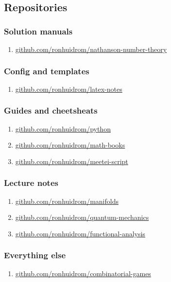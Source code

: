 \documentclass{article}
\begin{document}
\subsection*{Repositories}

\subsubsection*{Solution manuals}

\begin{enumerate}[resume]
\item \href{https://github.com/ronhuidrom/nathanson-number-theory}{github.com/ronhuidrom/nathanson-number-theory}
\end{enumerate}

\subsubsection*{Config and templates}

\begin{enumerate}[resume]
\item \href{https://github.com/ronhuidrom/latex-notes}{github.com/ronhuidrom/latex-notes}
\end{enumerate}

\subsubsection*{Guides and cheetsheats}

\begin{enumerate}[resume]
\item \href{https://github.com/ronhuidrom/python}{github.com/ronhuidrom/python} 
\item \href{https://github.com/ronhuidrom/math-books}{github.com/ronhuidrom/math-books} 
\item \href{https://github.com/ronhuidrom/meetei-script}{github.com/ronhuidrom/meetei-script} 
\end{enumerate}

\subsubsection*{Lecture notes}

\begin{enumerate}[resume]
\item \href{https://github.com/ronhuidrom/manifolds}{github.com/ronhuidrom/manifolds}
\item \href{https://github.com/ronhuidrom/quantum-mechanics}{github.com/ronhuidrom/quantum-mechanics}
\item \href{https://github.com/ronhuidrom/functional-analysis}{github.com/ronhuidrom/functional-analysis}
\end{enumerate}

\subsubsection*{Everything else}

\begin{enumerate}[resume]
\item \href{https://github.com/ronhuidrom/combinatorial-games}{github.com/ronhuidrom/combinatorial-games}
\end{enumerate}
\end{document}
